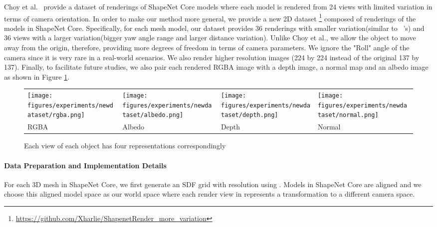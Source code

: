 \vspace{-5pt}
Choy et al.~\cite{choy20163d} provide a dataset of renderings of ShapeNet Core models where each model is rendered from 24 views with limited variation in terms of camera orientation. In order to make our method more general, we provide a new 2D dataset \footnote{\url{https://github.com/Xharlie/ShapenetRender_more_variation}} composed of renderings of the models in ShapeNet Core. Specifically, for each mesh model, our dataset provides 36 renderings with smaller variation(similar to ~\cite{choy20163d}'s) and 36 views with a larger variation(bigger yaw angle range and larger distance variation). Unlike Choy et al., we allow the object to move away from the origin, therefore, providing more degrees of freedom in terms of camera parameters. We ignore the "Roll" angle of the camera since it is very rare in a real-world scenarios. We also render higher resolution images (224 by 224 instead of the original 137 by 137). Finally, to facilitate future studies, we also pair each rendered RGBA image with a depth image, a normal map and an albedo image as shown in Figure \ref{fig:newdataset}.
\begin{figure}[htb!]
    \centering
    \hspace*{-0.5cm} 
    \renewcommand{\arraystretch}{1}
    \begin{tabular}{CCCC}
        \texttt{[image: figures/experiments/newdataset/rgba.png]}
        &\texttt{[image: figures/experiments/newdataset/albedo.png]}
        &\texttt{[image: figures/experiments/newdataset/depth.png]}
        &\texttt{[image: figures/experiments/newdataset/normal.png]}
    \\ \small{RGBA}& \small{Albedo} & \small{Depth} & \small{Normal}
    \end{tabular}
    \caption {Each view of each object has four representations correspondingly }
    \label{fig:newdataset} 
\end{figure}
\vspace{-15pt}
\vspace{-5pt}
\paragraph{Data Preparation and Implementation Details}
For each 3D mesh in ShapeNet Core, we first generate an SDF grid with resolution  using \cite{xu2014signed, sin2013vega}. Models in ShapeNet Core are aligned and we choose this aligned model space as our world space where each render view in \cite{choy20163d} represents a transformation to a different camera space. 

